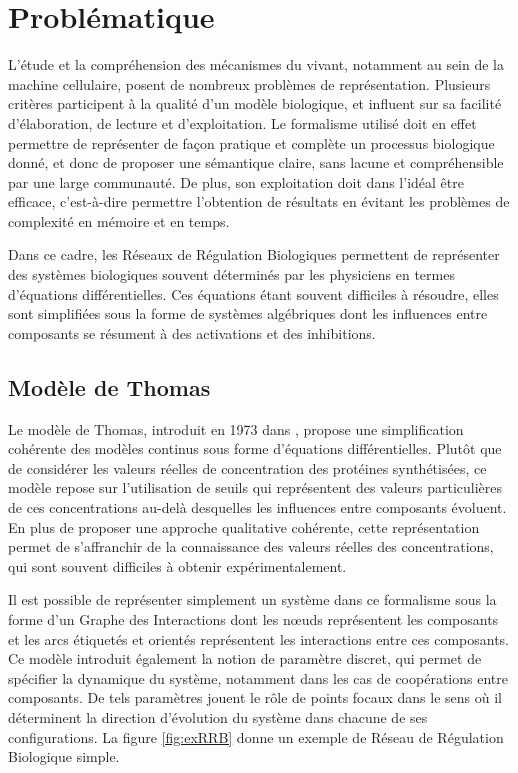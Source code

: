 
\chapter{Problématique}


L'étude et la compréhension des mécanismes du vivant, notamment au sein de la machine cellulaire, posent de nombreux problèmes de représentation.
Plusieurs critères participent à la qualité d'un modèle biologique, et influent sur sa facilité d'élaboration, de lecture et d'exploitation.
Le formalisme utilisé doit en effet permettre de représenter de façon pratique et complète un processus biologique donné, et donc
de proposer une sémantique claire, sans lacune et compréhensible par une large communauté.
De plus, son exploitation doit dans l'idéal être efficace, c'est-à-dire permettre l'obtention de résultats en évitant les problèmes de complexité en mémoire et en temps.

Dans ce cadre, les Réseaux de Régulation Biologiques permettent de représenter des systèmes biologiques souvent déterminés par les physiciens en termes d'équations différentielles.
Ces équations étant souvent difficiles à résoudre, elles sont simplifiées sous la forme de systèmes algébriques dont les influences entre composants se résument à des activations et des inhibitions.

\section{Modèle de Thomas}
Le modèle de Thomas, introduit en 1973 dans \cite{Thomas73}, propose une simplification cohérente des modèles continus sous forme d'équations différentielles.
Plutôt que de considérer les valeurs réelles de concentration des protéines synthétisées, ce modèle repose sur l'utilisation de seuils qui représentent des valeurs particulières de ces concentrations au-delà desquelles les influences entre composants évoluent.
En plus de proposer une approche qualitative cohérente, cette représentation permet de s'affranchir de la connaissance des valeurs réelles des concentrations, qui sont souvent difficiles à obtenir expérimentalement.

Il est possible de représenter simplement un système dans ce formalisme sous la forme d'un Graphe des Interactions dont les nœuds représentent les composants et les arcs étiquetés et orientés représentent les interactions entre ces composants.
Ce modèle introduit également la notion de paramètre discret, qui permet de spécifier la dynamique du système, notamment dans les cas de coopérations entre composants.
De tels paramètres jouent le rôle de points focaux dans le sens où il déterminent la direction d'évolution du système dans chacune de ses configurations.
La figure \ref{fig:exRRB} donne un exemple de Réseau de Régulation Biologique simple.

